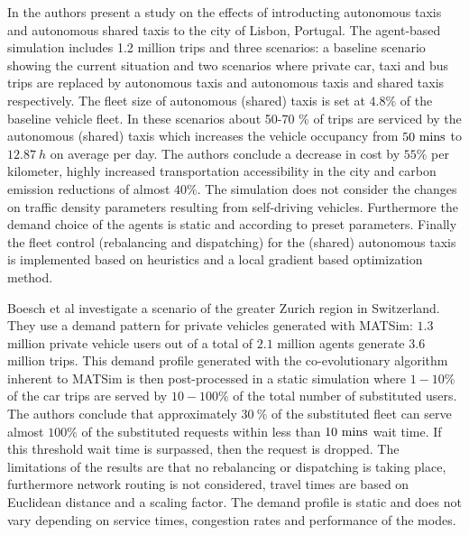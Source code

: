 In \cite{martinez2017assessing} the authors present a study on the effects of introducting autonomous taxis and autonomous shared taxis to the city of Lisbon, Portugal. The agent-based simulation includes 1.2 million trips and three scenarios: a baseline scenario showing the current situation and two scenarios where private car, taxi and bus trips are replaced by autonomous taxis and autonomous taxis and shared taxis respectively. The fleet size of autonomous (shared) taxis is set at $4.8\%$ of the baseline vehicle fleet. In these scenarios about 50-70 \% of trips are serviced by the autonomous (shared) taxis which increases the vehicle occupancy from $50 ~ \textnormal{mins}$ to $12.87 ~ h$ on average per day. The authors conclude a decrease in cost by $55 \%$ per kilometer, highly increased transportation accessibility in the city and carbon emission reductions of almost $40\%$. The simulation does not consider the changes on traffic density parameters resulting from self-driving vehicles. Furthermore the demand choice of the agents is static and according to preset parameters. Finally the fleet control (rebalancing and dispatching) for the (shared) autonomous taxis is implemented based on heuristics and a local gradient based optimization method.

Boesch et al \cite{boesch2016autonomous} investigate a scenario of the greater Zurich region in Switzerland. They use a demand pattern for private vehicles generated with MATSim: $1.3$ million  private vehicle users out of a total of $2.1$ million agents generate $3.6$ million trips. This demand profile generated with the co-evolutionary algorithm inherent to MATSim is then post-processed in a static simulation where $1-10 \%$ of the car trips are served by $10-100 \%$ of the total number of substituted users. The authors conclude that approximately $30 ~ \%$ of the substituted fleet can serve almost $100 \%$ of the substituted requests within less than $10 ~ \textnormal{mins}$ wait time. If this threshold wait time is surpassed, then the request is dropped. The limitations of the results are that no rebalancing or dispatching is taking place, furthermore network routing is not considered, travel times are based on Euclidean distance and a scaling factor. The demand profile is static and does not vary depending on service times, congestion rates and performance of the modes.

